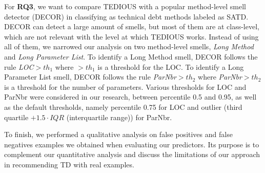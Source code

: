 For \textbf{RQ3}, we want to compare \ac{TEDIOUS} with a popular method-level smell detector (DECOR) \citep{moha2010decor} in classifying as technical debt methods labeled as \ac{SATD}. DECOR can detect a large amount of smells, but most of them are at class-level, which are not relevant with the level at which \ac{TEDIOUS} works. Instead of using all of them, we narrowed our analysis on two method-level smells, \textit{Long Method} and \textit{Long Parameter List}. To identify a Long Method smell, DECOR follows the rule {\em LOC}$>th_1$ where $>th_1$ is a threshold for the LOC. To identify a Long Parameter List smell, DECOR follows the rule {\em ParNbr}$>th_2$ where {\em ParNbr}$>th_2$ is a threshold for the number of parameters. Various thresholds for LOC and ParNbr were considered in our research, between percentile 0.5 and 0.95, as well as the default thresholds, namely percentile 0.75 for LOC and outlier (third quartile $+ 1.5 \cdot IQR$ (interquartile range)) for ParNbr.

To finish, we performed a qualitative analysis on false positives and false negatives examples we obtained when evaluating our predictors. Its purpose is to complement our quantitative analysis and discuss the limitations of our approach in recommending \ac{TD} with real examples.

























